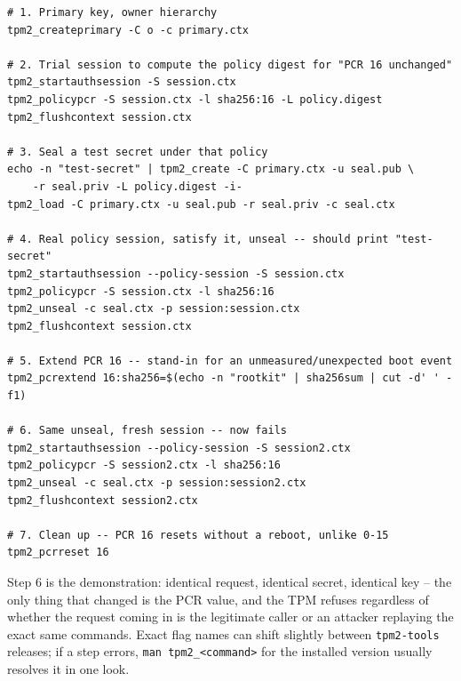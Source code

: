 \documentclass[11pt,a4paper]{article}
\begin{document}
\begin{lstlisting}
# 1. Primary key, owner hierarchy
tpm2_createprimary -C o -c primary.ctx

# 2. Trial session to compute the policy digest for "PCR 16 unchanged"
tpm2_startauthsession -S session.ctx
tpm2_policypcr -S session.ctx -l sha256:16 -L policy.digest
tpm2_flushcontext session.ctx

# 3. Seal a test secret under that policy
echo -n "test-secret" | tpm2_create -C primary.ctx -u seal.pub \
    -r seal.priv -L policy.digest -i-
tpm2_load -C primary.ctx -u seal.pub -r seal.priv -c seal.ctx

# 4. Real policy session, satisfy it, unseal -- should print "test-secret"
tpm2_startauthsession --policy-session -S session.ctx
tpm2_policypcr -S session.ctx -l sha256:16
tpm2_unseal -c seal.ctx -p session:session.ctx
tpm2_flushcontext session.ctx

# 5. Extend PCR 16 -- stand-in for an unmeasured/unexpected boot event
tpm2_pcrextend 16:sha256=$(echo -n "rootkit" | sha256sum | cut -d' ' -f1)

# 6. Same unseal, fresh session -- now fails
tpm2_startauthsession --policy-session -S session2.ctx
tpm2_policypcr -S session2.ctx -l sha256:16
tpm2_unseal -c seal.ctx -p session:session2.ctx
tpm2_flushcontext session2.ctx

# 7. Clean up -- PCR 16 resets without a reboot, unlike 0-15
tpm2_pcrreset 16
\end{lstlisting}

Step 6 is the demonstration: identical request, identical secret,
identical key -- the only thing that changed is the PCR value, and the
TPM refuses regardless of whether the request coming in is the
legitimate caller or an attacker replaying the exact same commands.
Exact flag names can shift slightly between \texttt{tpm2-tools}
releases; if a step errors, \texttt{man tpm2\_<command>} for the
installed version usually resolves it in one look.
\end{document}
